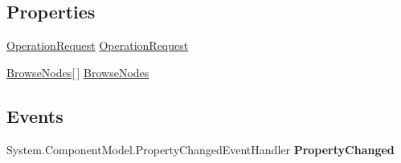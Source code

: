 \subsection*{Properties}
\begin{DoxyCompactItemize}
\item 
\hypertarget{class_price___comparison_1_1amazon_1_1ecs_1_1_browse_node_lookup_response_a9c883fc7798c592a25e1355c9fb0653c}{\hyperlink{class_price___comparison_1_1amazon_1_1ecs_1_1_operation_request}{Operation\-Request} \hyperlink{class_price___comparison_1_1amazon_1_1ecs_1_1_browse_node_lookup_response_a9c883fc7798c592a25e1355c9fb0653c}{Operation\-Request}}\label{class_price___comparison_1_1amazon_1_1ecs_1_1_browse_node_lookup_response_a9c883fc7798c592a25e1355c9fb0653c}

\begin{DoxyCompactList}\small\item\em \end{DoxyCompactList}\item 
\hypertarget{class_price___comparison_1_1amazon_1_1ecs_1_1_browse_node_lookup_response_a17a33a4c1001d39ba7cf44164f4413f9}{\hyperlink{class_price___comparison_1_1amazon_1_1ecs_1_1_browse_nodes}{Browse\-Nodes}\mbox{[}$\,$\mbox{]} \hyperlink{class_price___comparison_1_1amazon_1_1ecs_1_1_browse_node_lookup_response_a17a33a4c1001d39ba7cf44164f4413f9}{Browse\-Nodes}}\label{class_price___comparison_1_1amazon_1_1ecs_1_1_browse_node_lookup_response_a17a33a4c1001d39ba7cf44164f4413f9}

\begin{DoxyCompactList}\small\item\em \end{DoxyCompactList}\end{DoxyCompactItemize}
\subsection*{Events}
\begin{DoxyCompactItemize}
\item 
\hypertarget{class_price___comparison_1_1amazon_1_1ecs_1_1_browse_node_lookup_response_a89bec6677d453f96e07ddaa93ea350f2}{System.\-Component\-Model.\-Property\-Changed\-Event\-Handler {\bfseries Property\-Changed}}\label{class_price___comparison_1_1amazon_1_1ecs_1_1_browse_node_lookup_response_a89bec6677d453f96e07ddaa93ea350f2}

\end{DoxyCompactItemize}
